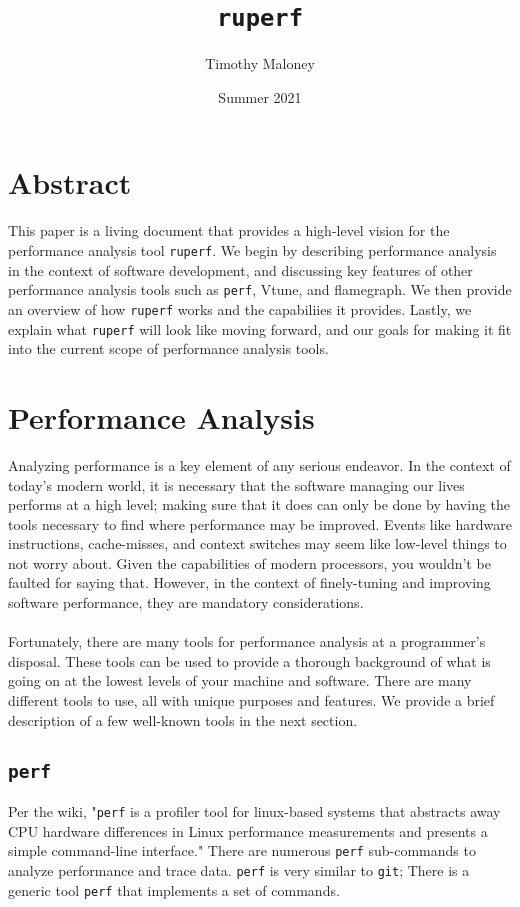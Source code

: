 \documentclass{article}
\title{\texttt{ruperf}}
\author{Timothy Maloney}
\date{Summer 2021}
\begin{document}
\maketitle
\section*{Abstract} This paper is a living document that provides a high-level vision for the performance analysis tool \texttt{ruperf}.
We begin by describing performance analysis in the context of software development, and discussing key features of other 
performance analysis tools such as \texttt{perf}, Vtune, and flamegraph. We then provide an overview of how \texttt{ruperf} works
and the capabiliies it provides. Lastly, we explain what \texttt{ruperf} will look like moving forward, and our goals for making it 
fit into the current scope of performance analysis tools.
\pagebreak
\section{Performance Analysis}
Analyzing performance is a key element of any serious endeavor. In the context of today's modern world, it is necessary 
that the software managing our lives performs at a high level; making sure that it does can only be done by having the tools
necessary to find where performance may be improved. Events like hardware instructions, cache-misses, 
and context switches may seem like low-level things to not worry about. Given the capabilities of modern processors, you wouldn't be 
faulted for saying that. However, in the context of finely-tuning and improving software performance, they are mandatory considerations. 
\\\\
Fortunately, there are many tools for performance analysis at a programmer's disposal. These tools can be used to provide a 
thorough background of what is going on at the lowest levels of your machine and software. There are many different tools to use, all with
unique purposes and features. We provide a brief description of a few well-known tools in the next section.
\subsection{\texttt{perf}}
Per the wiki, "\texttt{perf} is a profiler tool for linux-based systems that abstracts away CPU hardware differences in Linux performance measurements and presents a simple command-line interface." There are numerous \texttt{perf} sub-commands to analyze performance and trace data. \texttt{perf} is very similar to \texttt{git}; There is a generic tool \texttt{perf} that
implements a set of commands.
\end{document}
